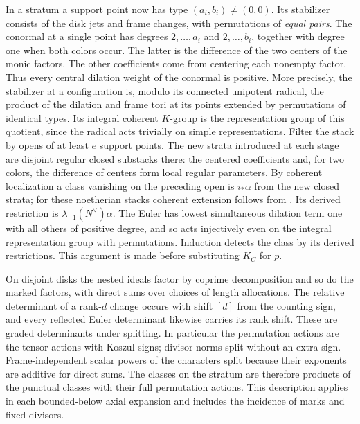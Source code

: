 In a stratum a support point now has type $(a_i,b_i)\ne(0,0)$. Its stabilizer consists of the disk jets and frame changes, with permutations of \emph{equal pairs}. The conormal at a single point has degrees $2,\ldots,a_i$ and $2,\ldots,b_i$, together with degree one when both colors occur. The latter is the difference of the two centers of the monic factors. The other coefficients come from centering each nonempty factor. Thus every central dilation weight of the conormal is positive. More precisely, the stabilizer at a configuration is, modulo its connected unipotent radical, the product of the dilation and frame tori at its points extended by permutations of identical types. Its integral coherent $K$-group is the representation group of this quotient, since the radical acts trivially on simple representations. Filter the stack by opens of at least $e$ support points. The new strata introduced at each stage are disjoint regular closed substacks there: the centered coefficients and, for two colors, the difference of centers form local regular parameters. By coherent localization a class vanishing on the preceding open is $i_*\alpha$ from the new closed strata; for these noetherian stacks coherent extension follows from \cite{Ry}. Its derived restriction is $\lambda_{-1}(N^\vee)\alpha$. The Euler has lowest simultaneous dilation term one with all others of positive degree, and so acts injectively even on the integral representation group with permutations. Induction detects the class by its derived restrictions. This argument is made before substituting $K_C$ for $p$.

On disjoint disks the nested ideals factor by coprime decomposition and so do the marked factors, with direct sums over choices of length allocations. The relative determinant of a rank-$d$ change occurs with shift $[d]$ from the counting sign, and every reflected Euler determinant likewise carries its rank shift. These are graded determinants under splitting. In particular the permutation actions are the tensor actions with Koszul signs; divisor norms split without an extra sign. Frame-independent scalar powers of the characters split because their exponents are additive for direct sums. The classes on the stratum are therefore products of the punctual classes with their full permutation actions. This description applies in each bounded-below axial expansion and includes the incidence of marks and fixed divisors.

